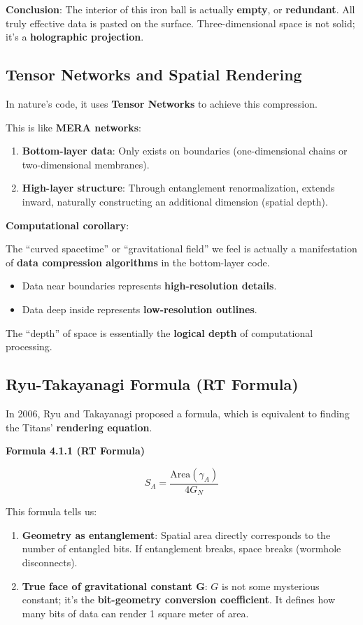 \textbf{Conclusion}: The interior of this iron ball is actually \textbf{empty}, or \textbf{redundant}. All truly effective data is pasted on the surface. Three-dimensional space is not solid; it's a \textbf{holographic projection}.

\subsection{Tensor Networks and Spatial Rendering}

In nature's code, it uses \textbf{Tensor Networks} to achieve this compression.

This is like \textbf{MERA networks}:
\begin{enumerate}
\item \textbf{Bottom-layer data}: Only exists on boundaries (one-dimensional chains or two-dimensional membranes).
\item \textbf{High-layer structure}: Through entanglement renormalization, extends inward, naturally constructing an additional dimension (spatial depth).
\end{enumerate}

\textbf{Computational corollary}:

The ``curved spacetime'' or ``gravitational field'' we feel is actually a manifestation of \textbf{data compression algorithms} in the bottom-layer code.
\begin{itemize}
\item Data near boundaries represents \textbf{high-resolution details}.
\item Data deep inside represents \textbf{low-resolution outlines}.
\end{itemize}

The ``depth'' of space is essentially the \textbf{logical depth} of computational processing.

\subsection{Ryu-Takayanagi Formula (RT Formula)}

In 2006, Ryu and Takayanagi proposed a formula, which is equivalent to finding the Titans' \textbf{rendering equation}.

\textbf{Formula 4.1.1 (RT Formula)}

\[
S_A = \frac{\text{Area}(\gamma_A)}{4G_N}
\]

This formula tells us:
\begin{enumerate}
\item \textbf{Geometry as entanglement}: Spatial area directly corresponds to the number of entangled bits. If entanglement breaks, space breaks (wormhole disconnects).
\item \textbf{True face of gravitational constant G}: $G$ is not some mysterious constant; it's the \textbf{bit-geometry conversion coefficient}. It defines how many bits of data can render 1 square meter of area.
\end{enumerate}

